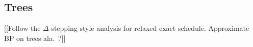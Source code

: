 \documentclass[11pt,a4paper]{article}
\newtheorem{theorem}{Theorem}
\theoremstyle{remark}
\newcommand{\N}{\mathcal{N}}
\newcommand{\norm}[1]{\lVert #1 \rVert}
\begin{document}



\subsection{Trees}

[[Follow the $\Delta$-stepping style analysis for relaxed exact schedule. Approximate BP on trees ala.~\cite{pmlr-v5-gonzalez09a}?]]

\renewcommand{\doi}[1]{\href{http://dx.doi.org/#1}{\footnotesize\sf doi:\Doi{#1}}}



\end{document}
